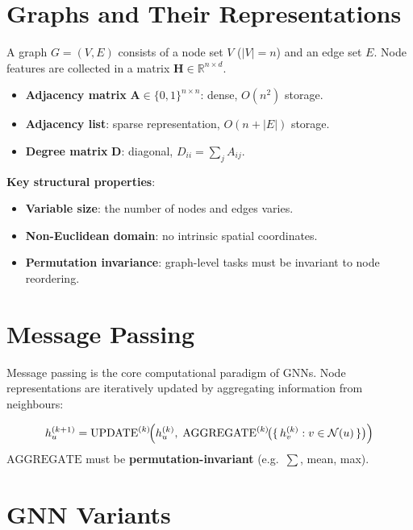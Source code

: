 \documentclass[12pt,a4paper]{report}
\newcommand{\mat}[1]{\mathbf{#1}}
\begin{document}
\section{Graphs and Their Representations}

A graph $G=(V,E)$ consists of a node set $V$ ($|V|=n$) and an edge set $E$.
Node features are collected in a matrix $\mat{H}\in\mathbb{R}^{n\times d}$.

\begin{itemize}[itemsep=2pt]
    \item \textbf{Adjacency matrix} $\mat{A}\in\{0,1\}^{n\times n}$: dense,
          $O(n^2)$ storage.
    \item \textbf{Adjacency list}: sparse representation, $O(n+|E|)$ storage.
    \item \textbf{Degree matrix} $\mat{D}$: diagonal, $D_{ii}=\sum_j A_{ij}$.
\end{itemize}

\textbf{Key structural properties}:
\begin{itemize}[itemsep=1pt]
    \item \textbf{Variable size}: the number of nodes and edges varies.
    \item \textbf{Non-Euclidean domain}: no intrinsic spatial coordinates.
    \item \textbf{Permutation invariance}: graph-level tasks must be invariant
          to node reordering.
\end{itemize}

\section{Message Passing}

Message passing is the core computational paradigm of GNNs.  Node
representations are iteratively updated by aggregating information from
neighbours:

\begin{formulabox}
\[
    h_u^{(k+1)} = \mathrm{UPDATE}^{(k)}\!\Bigl(h_u^{(k)},\;
    \mathrm{AGGREGATE}^{(k)}\!\bigl(\{\,h_v^{(k)} : v\in\mathcal{N}(u)\,\}\bigr)\Bigr)
\]
$\mathrm{AGGREGATE}$ must be \textbf{permutation-invariant}
(e.g.\ $\sum$, mean, max).
\end{formulabox}

\section{GNN Variants}
\end{document}
